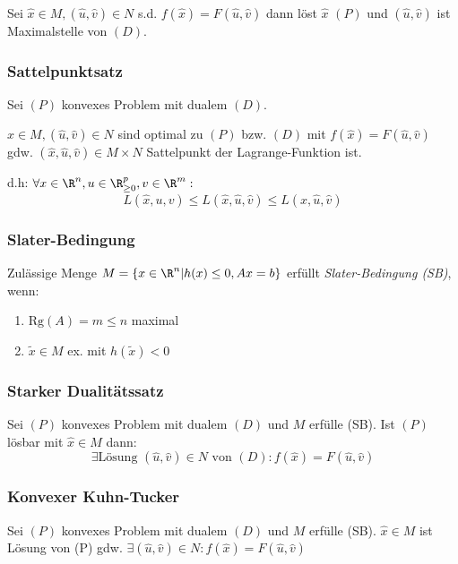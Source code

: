 Sei \(\hat x \in M, (\hat u, \hat v) \in N\) s.d. \(f(\hat x) = F(\hat u, \hat v)\) dann löst \(\hat x\) \((P)\) und \((\hat u, \hat v)\) ist Maximalstelle von \((D)\).

\subsubsection*{Sattelpunktsatz}

Sei \((P)\) konvexes Problem mit dualem \((D)\).

\(\hat x \in M, (\hat u, \hat v) \in N\) sind optimal zu \((P)\) bzw. \((D)\) mit \(f(\hat x) = F(\hat u, \hat v)\) gdw. \((\hat x, \hat u, \hat v) \in M \times N\) Sattelpunkt der Lagrange-Funktion ist.

d.h: \(\forall x \in \R^n, u \in \R_{\geq 0}^p, v \in \R^m :\) \[L(\hat x,u,v) \leq L(\hat x,\hat u,\hat v) \leq L(x,\hat u,\hat v)\]

\subsubsection*{Slater-Bedingung}

Zulässige Menge \(M = \{x \in \R^n | h(x) \leq 0, Ax=b\}\) erfüllt \emph{Slater-Bedingung (SB)}, wenn:

\begin{enumerate}[label=(\roman*)]
	\item \(\text{Rg}(A) = m \leq n\) maximal
	\item \(\tilde x \in M\) ex. mit \(h(\tilde x) < 0\)
\end{enumerate}

\subsubsection*{Starker Dualitätssatz}

Sei \((P)\) konvexes Problem mit dualem \((D)\) und \(M\) erfülle (SB). Ist \((P)\) lösbar mit \(\hat x \in M\) dann:
\[\exists \text{Lösung } (\hat u,\hat v) \in N \text{ von } (D) : f(\hat x) = F(\hat u,\hat v)\]

\subsubsection*{Konvexer Kuhn-Tucker}

Sei \((P)\) konvexes Problem mit dualem \((D)\) und \(M\) erfülle (SB).
\(\hat x \in M\) ist Lösung von (P) gdw. \(\exists (\hat u,\hat v) \in N : f(\hat x) = F(\hat u,\hat v)\)

